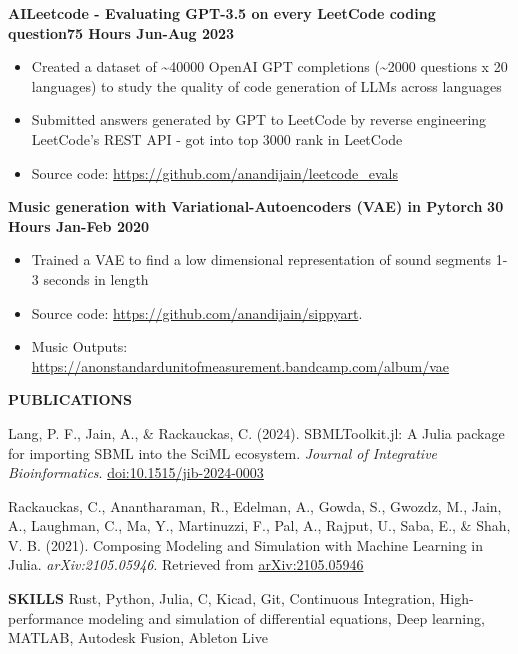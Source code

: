 \documentclass[10pt]{extarticle}
\begin{document}
\begin{list}{}{\setlength{\leftmargin}{1.4in}\setlength{\labelsep}{0.1cm}\setlength{\labelwidth}{1.18in}}
{\bf AILeetcode - Evaluating GPT-3.5 on every LeetCode coding question}\hfill {\bf 75 Hours Jun-Aug 2023}
\begin{itemize}[noitemsep]
	\item Created a dataset of \textasciitilde40000 OpenAI GPT completions (\textasciitilde2000 questions x 20 languages) to study the quality of code generation of LLMs across languages
	\item Submitted answers generated by GPT to LeetCode by reverse engineering LeetCode's REST API - got into top 3000 rank in LeetCode
	\item Source code: \url{https://github.com/anandijain/leetcode_evals}
\end{itemize}

{\bf Music generation with Variational-Autoencoders (VAE) in Pytorch} \hfill {\bf30 Hours Jan-Feb 2020}
\begin{itemize}[noitemsep]
	\item Trained a VAE to find a low dimensional representation of sound segments 1-3 seconds in length
	\item Source code: \url{https://github.com/anandijain/sippyart}. 
	\item Music Outputs: \url{https://anonstandardunitofmeasurement.bandcamp.com/album/vae}
\end{itemize}

\item[\bf PUBLICATIONS\hfill]

Lang, P. F., Jain, A., \& Rackauckas, C. (2024). SBMLToolkit.jl: A Julia package for importing SBML into the SciML ecosystem. \textit{Journal of Integrative Bioinformatics}. \href{https://www.degruyter.com/document/doi/10.1515/jib-2024-0003/html}{doi:10.1515/jib-2024-0003}

Rackauckas, C., Anantharaman, R., Edelman, A., Gowda, S., Gwozdz, M., Jain, A., Laughman, C., Ma, Y., Martinuzzi, F., Pal, A., Rajput, U., Saba, E., \& Shah, V. B. (2021). Composing Modeling and Simulation with Machine Learning in Julia. \textit{arXiv:2105.05946}. Retrieved from \href{https://arxiv.org/abs/2105.05946}{arXiv:2105.05946}


\item[\bf SKILLS\hfill] Rust, Python, Julia, C, Kicad, Git, Continuous Integration, High-performance modeling and simulation of differential equations, Deep learning, MATLAB, Autodesk Fusion, Ableton Live

\end{list}
\end{document}
